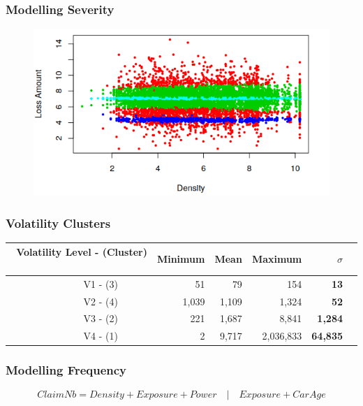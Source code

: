 \documentclass{beamer}
\begin{document}
\begin{frame}
\frametitle{Modelling Severity}
\begin{figure}[!htb]
\label{fig:vet1}
\begin{center}
\includegraphics[scale=0.83]{SeverityPlot}
\end{center}
\end{figure}
\end{frame}

\begin{frame}
\frametitle{Volatility Clusters}
\begin{tabular}{rrrrrr}
\hline\hline
Volatility Level - (Cluster)  $\quad$    & Minimum & Mean  & Maximum & $\sigma$    \\
\hline
V1 - (3)$\quad\quad\quad$ & 51  & 79 & 154 & \textbf{ 13} \\
V2 - (4)$\quad\quad\quad$ & 1,039  & 1,109  &  1,324 & \textbf{ 52} \\
V3 - (2)$\quad\quad\quad$ & 221 & 1,687  & 8,841  &\textbf{ 1,284}  \\
V4 - (1)$\quad\quad\quad$ & 2 & 9,717 & 2,036,833  & \textbf{ 64,835}   \\
\hline\hline
\end{tabular}
\end{frame}
\begin{frame}
\frametitle{Modelling Frequency}
\begin{equation}
Claim Nb = Density + Exposure + Power \quad|\quad Exposure + Car Age
\end{equation}
\end{frame}
\end{document}
